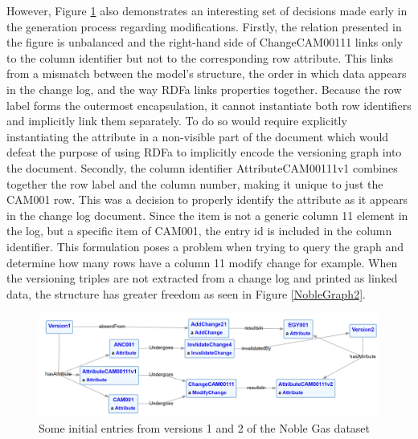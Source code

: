 However, Figure \ref{NobleGraph1} also demonstrates an interesting set of decisions made early in the generation process regarding modifications.
Firstly, the relation presented in the figure is unbalanced and the right-hand side of ChangeCAM00111 links only to the column identifier but not to the corresponding row attribute.
This links from a mismatch between the model's structure, the order in which data appears in the change log, and the way RDFa links properties together.
Because the row label forms the outermost encapsulation, it cannot instantiate both row identifiers and implicitly link them separately.
To do so would require explicitly instantiating the attribute in a non-visible part of the document which would defeat the purpose of using RDFa to implicitly encode the versioning graph into the document.
Secondly, the column identifier AttributeCAM00111v1 combines together the row label and the column number, making it unique to just the CAM001 row.
This was a decision to properly identify the attribute as it appears in the change log document.
Since the item is not a generic column 11 element in the log, but a specific item of CAM001, the entry id is included in the column identifier.
This formulation poses a problem when trying to query the graph and determine how many rows have a column 11 modify change for example.
When the versioning triples are not extracted from a change log and printed as linked data, the structure has greater freedom as seen in Figure \ref{NobleGraph2}.

\begin{figure}
	\centering
	\includegraphics[scale=0.30]{figures/NobleVersion.png}
	\caption{Some initial entries from versions 1 and 2 of the Noble Gas dataset}
	\label{NobleGraph1}
\end{figure}

